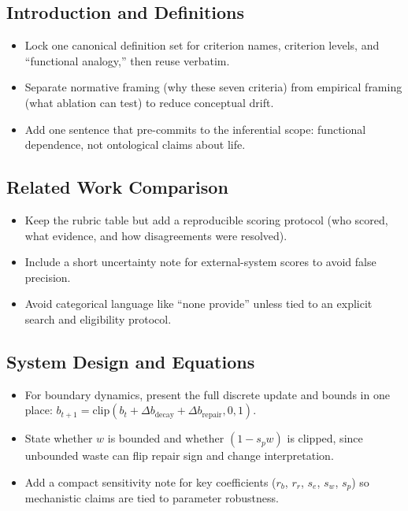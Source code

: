 \documentclass[11pt]{article}
\begin{document}
\subsection*{Introduction and Definitions}
\begin{itemize}
  \item Lock one canonical definition set for criterion names, criterion levels, and ``functional analogy,'' then reuse verbatim.
  \item Separate normative framing (why these seven criteria) from empirical framing (what ablation can test) to reduce conceptual drift.
  \item Add one sentence that pre-commits to the inferential scope: functional dependence, not ontological claims about life.
\end{itemize}

\subsection*{Related Work Comparison}
\begin{itemize}
  \item Keep the rubric table but add a reproducible scoring protocol (who scored, what evidence, and how disagreements were resolved).
  \item Include a short uncertainty note for external-system scores to avoid false precision.
  \item Avoid categorical language like ``none provide'' unless tied to an explicit search and eligibility protocol.
\end{itemize}

\subsection*{System Design and Equations}
\begin{itemize}
  \item For boundary dynamics, present the full discrete update and bounds in one place: $b_{t+1}=\mathrm{clip}(b_t+\Delta b_{\mathrm{decay}}+\Delta b_{\mathrm{repair}},0,1)$.
  \item State whether $w$ is bounded and whether $(1-s_p w)$ is clipped, since unbounded waste can flip repair sign and change interpretation.
  \item Add a compact sensitivity note for key coefficients ($r_b$, $r_r$, $s_e$, $s_w$, $s_p$) so mechanistic claims are tied to parameter robustness.
\end{itemize}
\end{document}
